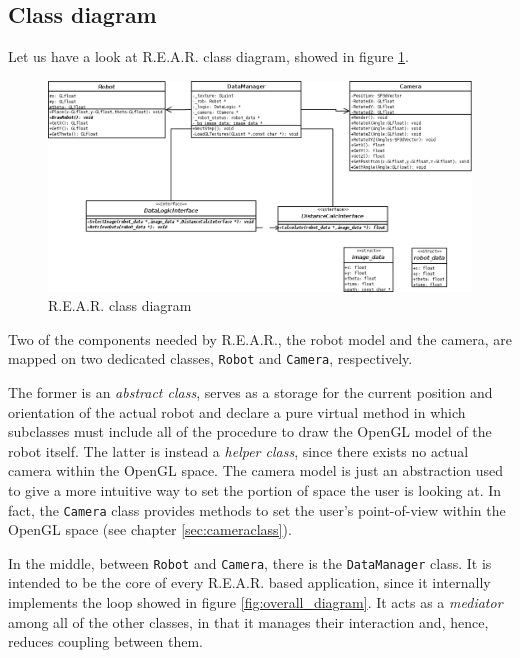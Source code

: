 \subsection{Class diagram}
\label{sec:classdiagram}
%
Let us have a look at \textsf{R.E.A.R.} class diagram, 
showed in figure \ref {fig:class_diagram}.
%
\begin{figure}[!h]
  \begin{center}
    \includegraphics[width=400pt]{img/rear_class_diagram.png}
    \caption{\textsf{R.E.A.R.} class diagram}
    \label{fig:class_diagram}
  \end{center}
\end{figure}
%
Two of the components needed by \textsf{R.E.A.R.}, the robot 
model and the camera, are mapped on two dedicated classes, 
\texttt{Robot} and \texttt{Camera}, respectively.
%

%
The former is an \textit{abstract class}, serves as a storage 
for the current position and orientation of the actual
robot and declare a pure virtual method in which subclasses 
must include all of the procedure to draw the OpenGL model 
of the robot itself.
%
The latter is instead a \textit{helper class}, since there 
exists no actual camera within the OpenGL space. The camera 
model is just an abstraction used to give a more intuitive
way to set the portion of space the user is looking at.
In fact, the \texttt{Camera} class provides methods to 
set the user's point-of-view within the OpenGL space (see
chapter \ref{sec:cameraclass}).
%

%
In the middle, between \texttt{Robot} and \texttt{Camera},
there is the \texttt{DataManager} class. It is intended to be 
the core of every \textsf{R.E.A.R.} based application, since it 
internally implements the loop showed in figure 
\ref{fig:overall_diagram}.
It acts as a \textit{mediator} among all of the other classes, 
in that it manages their interaction and, hence, reduces 
coupling between them.
%

